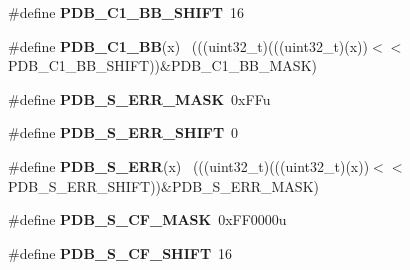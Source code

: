 \begin{DoxyCompactItemize}
\item 
\hypertarget{group___p_d_b___register___masks_gadd4b49047fcd1a75374752c012a931d8}{}\#define {\bfseries P\+D\+B\+\_\+\+C1\+\_\+\+B\+B\+\_\+\+S\+H\+I\+F\+T}~16\label{group___p_d_b___register___masks_gadd4b49047fcd1a75374752c012a931d8}

\item 
\hypertarget{group___p_d_b___register___masks_ga9b59c900467acc6be0d8963aa5c88e91}{}\#define {\bfseries P\+D\+B\+\_\+\+C1\+\_\+\+B\+B}(x)                                                      ~(((uint32\+\_\+t)(((uint32\+\_\+t)(x))$<$$<$P\+D\+B\+\_\+\+C1\+\_\+\+B\+B\+\_\+\+S\+H\+I\+F\+T))\&P\+D\+B\+\_\+\+C1\+\_\+\+B\+B\+\_\+\+M\+A\+S\+K)\label{group___p_d_b___register___masks_ga9b59c900467acc6be0d8963aa5c88e91}

\item 
\hypertarget{group___p_d_b___register___masks_ga544472023dc6de6708b210d54d64c69c}{}\#define {\bfseries P\+D\+B\+\_\+\+S\+\_\+\+E\+R\+R\+\_\+\+M\+A\+S\+K}~0x\+F\+Fu\label{group___p_d_b___register___masks_ga544472023dc6de6708b210d54d64c69c}

\item 
\hypertarget{group___p_d_b___register___masks_ga3b10142858bded9ff7916076433dbcb6}{}\#define {\bfseries P\+D\+B\+\_\+\+S\+\_\+\+E\+R\+R\+\_\+\+S\+H\+I\+F\+T}~0\label{group___p_d_b___register___masks_ga3b10142858bded9ff7916076433dbcb6}

\item 
\hypertarget{group___p_d_b___register___masks_ga52caf9f629d2d46073999f760e575cf5}{}\#define {\bfseries P\+D\+B\+\_\+\+S\+\_\+\+E\+R\+R}(x)                                                      ~(((uint32\+\_\+t)(((uint32\+\_\+t)(x))$<$$<$P\+D\+B\+\_\+\+S\+\_\+\+E\+R\+R\+\_\+\+S\+H\+I\+F\+T))\&P\+D\+B\+\_\+\+S\+\_\+\+E\+R\+R\+\_\+\+M\+A\+S\+K)\label{group___p_d_b___register___masks_ga52caf9f629d2d46073999f760e575cf5}

\item 
\hypertarget{group___p_d_b___register___masks_gabf6ae593f200a1eda316cd9affa9f5b2}{}\#define {\bfseries P\+D\+B\+\_\+\+S\+\_\+\+C\+F\+\_\+\+M\+A\+S\+K}~0x\+F\+F0000u\label{group___p_d_b___register___masks_gabf6ae593f200a1eda316cd9affa9f5b2}

\item 
\hypertarget{group___p_d_b___register___masks_ga17f0097777c1377488f0bf9654021714}{}\#define {\bfseries P\+D\+B\+\_\+\+S\+\_\+\+C\+F\+\_\+\+S\+H\+I\+F\+T}~16\label{group___p_d_b___register___masks_ga17f0097777c1377488f0bf9654021714}


\end{DoxyCompactItemize}
